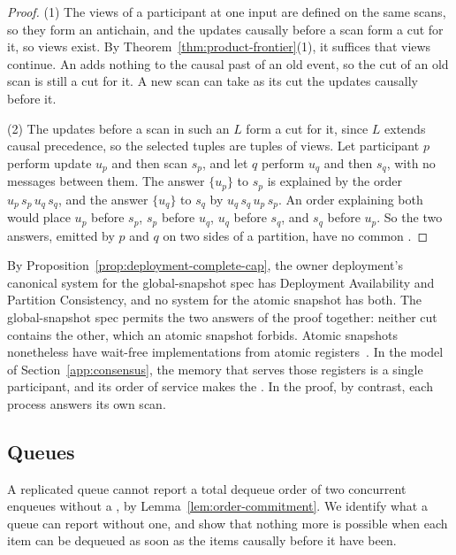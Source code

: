 \begin{proof}
(1) The views of a participant at one input are defined on the same scans,
so they form an antichain, and the updates causally before a scan form a cut
for it, so views exist.  By Theorem~\ref{thm:product-frontier}(1), it
suffices that views continue.  An \indesc adds nothing to the causal past of
an old event, so the cut of an old scan is still a cut for it.  A new scan can take as its cut the
updates causally before it.

(2) The updates before a scan in such an $L$ form a cut for it, since $L$
extends causal precedence, so the selected tuples are tuples of views.  Let
participant $p$ perform update $u_p$ and then scan $s_p$, and let $q$
perform $u_q$ and then $s_q$, with no messages between them.  The answer
$\{u_p\}$ to $s_p$ is explained by the order $u_p\,s_p\,u_q\,s_q$, and the
answer $\{u_q\}$ to $s_q$ by $u_q\,s_q\,u_p\,s_p$.  An order explaining both
would place $u_p$ before $s_p$, $s_p$ before $u_q$, $u_q$ before $s_q$, and
$s_q$ before $u_p$.  So the two answers, emitted by $p$ and $q$ on two sides of
a partition, have no common \outnoun.
\end{proof}

By Proposition~\ref{prop:deployment-complete-cap}, the owner deployment's
canonical system for the global-snapshot spec has Deployment Availability and
Partition Consistency, and no system for the atomic snapshot has both.  The
global-snapshot spec permits the two answers of the proof together: neither
cut contains the other, which an atomic snapshot forbids.  Atomic snapshots
nonetheless have wait-free implementations from atomic
registers~\cite{afek1993atomic}.  In the model of
Section~\ref{app:consensus}, the memory that serves those registers is a
single participant, and its order of service makes the \commitments.  In the
proof, by contrast, each process answers its own scan.

\subsection{Queues}
\label{app:queue}

A replicated queue cannot report a total dequeue order of two concurrent
enqueues without a \commitment, by Lemma~\ref{lem:order-commitment}.  We
identify what a queue can report without one, and show that nothing more is
possible when each item can be dequeued as soon as the items causally before
it have been.

